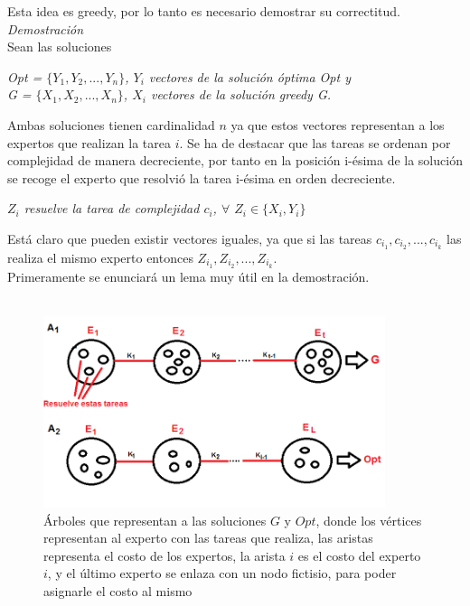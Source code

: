 \documentclass[10pt,letterpaper]{article}
\begin{document}
{ 	Esta idea es greedy, por lo tanto es necesario demostrar su correctitud. \\
 	\textit{Demostraci\'on} \\
 	Sean las soluciones
 	\begin{center}
 	\textit{Opt = $\{ Y_{1}, Y_{2}, . . . , Y_{n} \}$, $Y_{i}$ vectores de la soluci\'on \'optima Opt y \\
 	G = $\{ X_{1}, X_{2}, . . . , X_{n} \}$, $X_{i}$ vectores de la soluci\'on greedy G.}
 	\end{center}
 	Ambas soluciones tienen cardinalidad $n$ ya que estos vectores representan a los expertos que realizan la tarea $i$. Se ha de destacar que las tareas se ordenan por complejidad de manera decreciente, por tanto en la posici\'on i-\'esima de la soluci\'on se recoge el experto que resolvi\'o la tarea i-\'esima en orden decreciente. \\
 	\begin{center}
 	\textit{$Z_{i}$ resuelve la tarea de complejidad $c_{i}$, $\forall$ $Z_{i} \in \{ X_{i}, Y_{i} \}$} \\
 	\end{center}
 		Est\'a claro que pueden existir vectores iguales, ya que si las tareas $c_{i_{1}}, c_{i_{2}}, . . ., c_{i_{k}}$ las realiza el mismo experto entonces $Z_{i_{1}}, Z_{i_{2}}, . . ., Z_{i_{k}}$. \\
 	
 
 	
 	Primeramente se enunciar\'a un lema muy \'util en la demostraci\'on. \\ \\
 	
 	 		\begin{figure}
 	 			\includegraphics[width=10cm]{mst.png}
 	 			\caption{\'Arboles que representan a las soluciones $G$ y $Opt$, donde los v\'ertices representan al experto con las tareas que realiza, las aristas representa el costo de los expertos, la arista $i$ es el costo del experto $i$, y el \'ultimo experto se enlaza con un nodo fictisio, para poder asignarle el costo al mismo}
 	 		\end{figure}
 	
}
\end{document}
